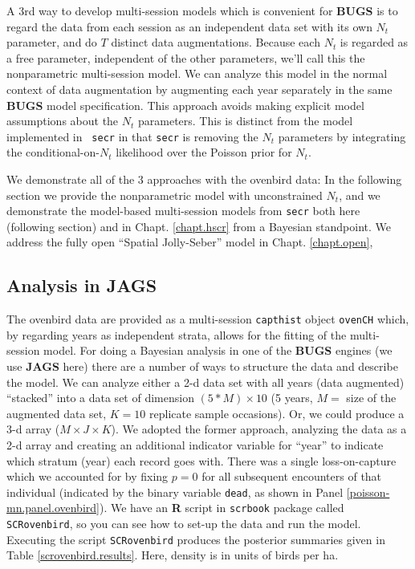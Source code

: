 A 3rd way to develop multi-session models which is convenient for {\bf
  BUGS} is to regard the data from each session as an independent data
set with its own $N_{t}$ parameter, and do $T$ distinct data augmentations. Because each $N_{t}$ is regarded
as a free parameter, independent of the other parameters, we'll call
this the nonparametric multi-session model.
We can analyze this model
in the normal context of data augmentation by augmenting each year
separately in the same {\bf BUGS} model specification. This approach
avoids making explicit model assumptions about the $N_{t}$
parameters.  This is distinct from the model implemented in \mbox{\tt
  secr} in that \mbox{\tt secr} is removing the $N_{t}$ parameters by
integrating the conditional-on-$N_{t}$ likelihood over the Poisson
prior for $N_{t}$.

We
demonstrate all of the 3 approaches with the ovenbird data: In the
following section we provide the nonparametric model with
unconstrained $N_{t}$,
 and we demonstrate  the model-based
multi-session models from \mbox{\tt secr} both here (following section) and in
Chapt. \ref{chapt.hscr} from a Bayesian standpoint.
We address the fully open ``Spatial Jolly-Seber''
model in Chapt. \ref{chapt.open},


\subsection{Analysis in JAGS}

The ovenbird data are provided as a multi-session \mbox{\tt capthist}
object \mbox{\tt ovenCH} which, by regarding years as independent
strata, allows for the fitting of the multi-session model.  For doing
a Bayesian analysis in one of the {\bf BUGS} engines (we use {\bf
  JAGS} here) there are a number of ways to structure the data and
describe the model.  We can analyze either a 2-d data set with all
years (data augmented) ``stacked'' into a data set of dimension $(5*M)
\times 10$ (5 years, $M=$ size of the augmented data set, $K=10$
replicate sample occasions). Or, we could produce a 3-d array ($M \times J
\times K$). We adopted the former approach, analyzing the data as a
2-d array and creating an additional indicator variable for ``year''
to indicate which stratum (year) each record goes with.  There was a
single loss-on-capture which we accounted for by fixing $p=0$ for all
subsequent encounters of that individual (indicated by the binary
variable \mbox{\tt dead}, as shown in Panel
\ref{poisson-mn.panel.ovenbird}).  We have an {\bf R} script in
\mbox{\tt scrbook} package called \mbox{\tt SCRovenbird}, so you can
see how to set-up the data and run the model.  Executing the script
\mbox{\tt SCRovenbird} produces the posterior summaries given in Table
\ref{scrovenbird.results}. Here, density is in units of birds per ha.


